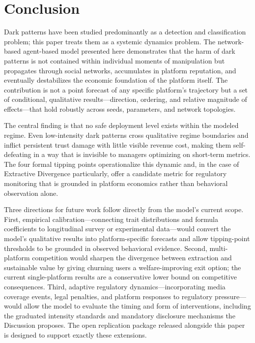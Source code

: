 \documentclass[a4paper]{article}
\begin{document}
\section{Conclusion}
Dark patterns have been studied predominantly as a detection and classification problem; this paper treats them as a systemic dynamics problem. The network-based agent-based model presented here demonstrates that the harm of dark patterns is not contained within individual moments of manipulation but propagates through social networks, accumulates in platform reputation, and eventually destabilizes the economic foundation of the platform itself. The contribution is not a point forecast of any specific platform's trajectory but a set of conditional, qualitative results---direction, ordering, and relative magnitude of effects---that hold robustly across seeds, parameters, and network topologies.

The central finding is that no safe deployment level exists within the modeled regime. Even low-intensity dark patterns cross qualitative regime boundaries and inflict persistent trust damage with little visible revenue cost, making them self-defeating in a way that is invisible to managers optimizing on short-term metrics. The four formal tipping points operationalize this dynamic and, in the case of Extractive Divergence particularly, offer a candidate metric for regulatory monitoring that is grounded in platform economics rather than behavioral observation alone.

Three directions for future work follow directly from the model's current scope. First, empirical calibration---connecting trait distributions and formula coefficients to longitudinal survey or experimental data---would convert the model's qualitative results into platform-specific forecasts and allow tipping-point thresholds to be grounded in observed behavioral evidence. Second, multi-platform competition would sharpen the divergence between extraction and sustainable value by giving churning users a welfare-improving exit option; the current single-platform results are a conservative lower bound on competitive consequences. Third, adaptive regulatory dynamics---incorporating media coverage events, legal penalties, and platform responses to regulatory pressure---would allow the model to evaluate the timing and form of interventions, including the graduated intensity standards and mandatory disclosure mechanisms the Discussion proposes. The open replication package released alongside this paper is designed to support exactly these extensions.
\end{document}

